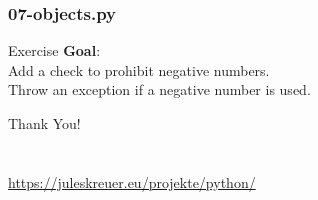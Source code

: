 \documentclass{beamer}
\begin{document}
\begin{frame}[fragile]
    \frametitle{07-objects.py}
\begin{exampleblock}{Exercise}
\textbf{Goal}:\\
 Add a check to prohibit negative numbers.\\
 Throw an exception if a negative number is used.
\end{exampleblock}

\end{frame}

\begin{frame}[fragile]
\centering
\LARGE
Thank You!\\
\vspace{0.5cm}
    \\\\
\large
    \url{https://juleskreuer.eu/projekte/python/}
\end{frame}
\end{document}
